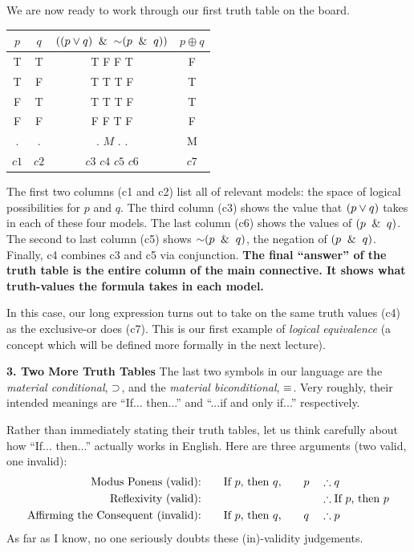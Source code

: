 \documentclass[options]{philosophersimprint}
\theoremstyle{definition}
\begin{document}
We are now ready to work through our first truth table on the board.
\begin{table}[h!]
\centering
\begin{tabular}{c c | c | c}
    $p$ & $q$ & $((p \mathbin{\vee} q) \ \mathbin{\&} \  \mathord{\sim} (p \ \mathbin{\&} \  q))$ & $p \oplus q$\\
    \hline
     T & T & T \quad F \quad F \quad T & F\\
     T & F & T \quad T \quad T \quad F & T\\
     F & T & T \quad T \quad T \quad F & T\\
     F & F & F \quad F \quad T \quad F & F\\
     \hline
     $.$ & $.$ & $.$ \quad $M$ \quad $.$ \quad $.$ & M\\
     $c1$ & $c2$ & $c3$ \quad $c4$ \quad $c5$ \quad $c6$ & $c7$\\
    \end{tabular}
\end{table}

The first two columns (c1 and c2) list all of relevant models: the space of logical possibilities for $p$ and $q$. The third column (c3) shows the value that $(p\mathbin{\vee} q)$ takes in each of these four models. The last column (c6) shows the values of $(p\ \mathbin{\&} \  q)$. The second to last column (c5) shows $\mathord{\sim} (p\ \mathbin{\&} \  q)$, the negation of $(p\ \mathbin{\&} \  q)$. Finally, c4 combines c3 and c5 via conjunction. \textbf{The final ``answer'' of the truth table is the entire column of the main connective. It shows what truth-values the formula takes in each model.}

In this case, our long expression turns out to take on the same truth values (c4) as the exclusive-or does (c7). This is our first example of \textit{logical equivalence} (a concept which will be defined more formally in the next lecture).

\textbf{3. Two More Truth Tables} The last two symbols in our language are the \textit{material conditional}, $\mathbin{\supset}$, and the \textit{material biconditional}, $\mathbin{\equiv}$. Very roughly, their intended meanings are ``If... then...'' and ``...if and only if...'' respectively.

Rather than immediately stating their truth tables, let us think carefully about how ``If... then...'' actually works in English. Here are three arguments (two valid, one invalid):
\begin{align}
\nonumber
\text{Modus Ponens (valid):}&\text{\qquad If $p$, then $q$,\qquad $p$} && \therefore q\\
\nonumber
\text{Reflexivity (valid):}& &&\therefore \text{If $p$, then $p$}\\
\nonumber
\text{Affirming the Consequent (invalid):}&\text{\qquad If $p$, then $q$,\qquad $q$}& &\therefore p
\end{align}
As far as I know, no one seriously doubts these (in)-validity judgements.
\end{document}
